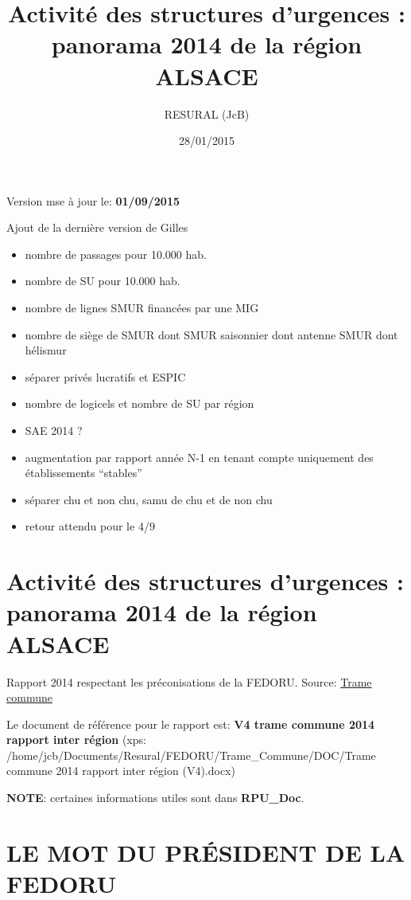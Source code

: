 \documentclass[]{article}
\title{Activité des structures d'urgences : panorama 2014 de la région ALSACE}
\author{RESURAL (JcB)}
\date{28/01/2015}
\begin{document}
\maketitle


{
\hypersetup{linkcolor=black}
\setcounter{tocdepth}{3}
\tableofcontents
}
Version mse à jour le: \textbf{01/09/2015}

Ajout de la dernière version de Gilles

\begin{itemize}
\itemsep1pt\parskip0pt
\item
  nombre de passages pour 10.000 hab.
\item
  nombre de SU pour 10.000 hab.
\item
  nombre de lignes SMUR financées par une MIG
\item
  nombre de siège de SMUR dont SMUR saisonnier dont antenne SMUR dont
  hélismur
\item
  séparer privés lucratifs et ESPIC
\item
  nombre de logicels et nombre de SU par région
\item
  SAE 2014 ?
\item
  augmentation par rapport année N-1 en tenant compte uniquement des
  établissements ``stables''
\item
  séparer chu et non chu, samu de chu et de non chu
\item
  retour attendu pour le 4/9
\end{itemize}

\section{Activité des structures d'urgences : panorama 2014 de la région
ALSACE}\label{activite-des-structures-durgences-panorama-2014-de-la-region-alsace}

Rapport 2014 respectant les préconisations de la FEDORU. Source:
\href{https://docs.google.com/document/d/101LYVqVLeHZnrujfMm3aqBYfbOwx3CPEB3Y-Lbud2Ls/edit}{Trame
commune}

Le document de référence pour le rapport est: \textbf{V4 trame commune
2014 rapport inter région} (xps:
/home/jcb/Documents/Resural/FEDORU/Trame\_Commune/DOC/Trame commune 2014
rapport inter région (V4).docx)

\textbf{NOTE}: certaines informations utiles sont dans
\textbf{RPU\_Doc}.

\section{LE MOT DU PRÉSIDENT DE LA
FEDORU}\label{le-mot-du-president-de-la-fedoru}
\end{document}
